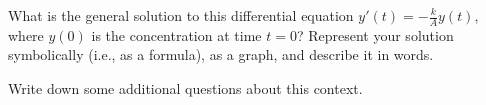 \documentclass[,nooutcomes]{ximera}
\begin{document}
\begin{question}
What is the general solution to this differential equation $y'(t)=-\frac{k}{A}y(t)$, where $y(0)$ is the concentration at time $t=0$? 
 Represent your solution symbolically (i.e., as a formula), as a graph, and describe it in words.   
\begin{freeResponse}
\end{freeResponse}
\end{question}

\begin{question}
Write down some additional questions about this context.       
\begin{freeResponse}
\end{freeResponse}
\end{question}
\end{document}
